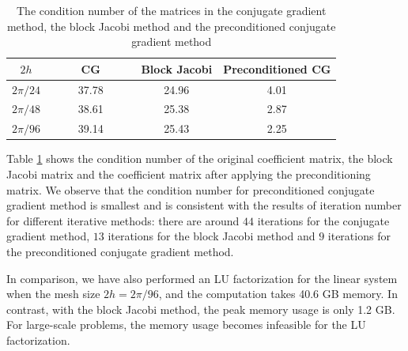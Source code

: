 \begin{table}[htbp]
	\begin{center}
		\begin{tabular}{|c|c c c|}
			\hline
			$2h$   & ~~~~ CG ~~~~& Block Jacobi & Preconditioned CG  \\
			\hline
			$2\pi/24$ &37.78& 24.96& 4.01\\
			\hline
			$2\pi/48$ &38.61 & 25.38 & 2.87\\
			\hline 
			$2\pi/96$ &39.14 &25.43 & 2.25\\
			\hline
		\end{tabular}
	\end{center}
		\caption{The condition number of the matrices in the conjugate gradient method, the block Jacobi method and the preconditioned conjugate gradient method}\label{condition_number}
\end{table} 
Table \ref{condition_number} shows the condition number of the original coefficient matrix, the block Jacobi matrix and the coefficient matrix after applying the preconditioning matrix. We observe that the condition number for preconditioned conjugate gradient method is smallest and is consistent with the results of iteration number for different iterative methods: there are around $44$ iterations for the conjugate gradient method, $13$ iterations for the block Jacobi method and $9$ iterations for the preconditioned conjugate gradient method.

In comparison, we have also performed an LU factorization for the linear system when the mesh size $2h = 2\pi/96$, and the computation takes 40.6 GB memory. In contrast, with the block Jacobi method, the peak memory usage is only 1.2 GB. For large-scale problems, the memory usage becomes infeasible for the LU factorization. 

